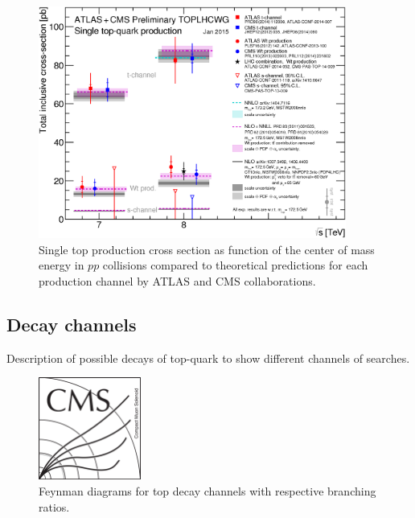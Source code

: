 \begin{figure}[!Hhtbp]
  \begin{center}
    \includegraphics[width=0.9\textwidth]{figs/singletop_allchanvsroots.png}
    \caption{Single top production cross section as function of the center of mass energy in $pp$ collisions compared to theoretical predictions for each production channel by ATLAS and CMS collaborations.}
    \label{fig:PairProduction}
  \end{center}
\end{figure}


\subsection{Decay channels}

Description of possible decays of top-quark to show different channels of searches.

\begin{figure}[!Hhtbp]
  \begin{center}
    \includegraphics[width=0.3\textwidth]{figs/CMSlogo.png}
    \caption{Feynman diagrams for top decay channels with respective branching ratios.}
    \label{fig:BRratiosandDecayChannels}
  \end{center}
\end{figure}

